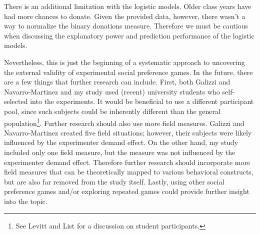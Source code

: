 \documentclass[12pt]{article}
\begin{document}
There is an additional limitation with the logistic models. Older class years have had more chances to donate. Given the provided data, however, there wasn\rq t a way to normalize the binary donations measure. Therefore we must be cautious when discussing the explanatory power and prediction performance of the logistic models.

Nevertheless, this is just the beginning of a systematic approach to uncovering the external validity of experimental social preference games. In the future, there are a few things that further research can include. First, both Galizzi and Navarro-Martinez and my study used (recent) university students who self-selected into the experiments. It would be beneficial to use a different participant pool, since such subjects could be inherently different than the general population\footnote{See Levitt and List for a discussion on student participants.}. Further research should also use more field measures. Galizzi and Navarro-Martinez created five field situations; however, their subjects were likely influenced by the experimenter demand effect. On the other hand, my study included only one field measure, but the measure was not influenced by the experimenter demand effect. Therefore further research should incorporate more field measures that can be theoretically mapped to various behavioral constructs, but are also far removed from the study itself. Lastly, using other social preference games and/or exploring repeated games could provide further insight into the topic.




\newpage




%
\end{document}
